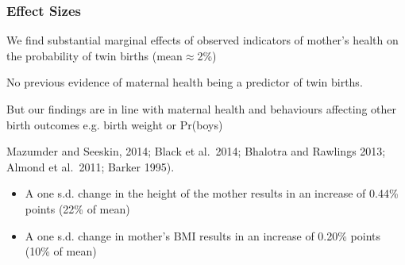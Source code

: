 \documentclass[9pt,letterpaper,subeqn]{beamer}
\begin{document}
\begin{frame}[label=robust]
\frametitle{Effect Sizes}
We find substantial marginal effects of observed indicators of mother’s health on the probability of twin births (mean$\approx$2\%)
\item No previous evidence of maternal health being a predictor of twin births.
\item But our findings are in line with maternal health and behaviours affecting other birth outcomes e.g. birth weight or Pr(boys) 
\item Mazumder and Seeskin, 2014; Black et al.\ 2014;  Bhalotra and Rawlings 2013; Almond et al.\ 2011; Barker 1995).\vspace{6mm}
\begin{itemize}
\item A one s.d. change in the height of the mother results in an increase of 0.44\% points (22\% of mean)
\item A one s.d. change in mother's BMI results in an increase of 0.20\% points (10\% of mean)\\ \vspace{5mm}
\end{itemize}
\end{frame}




\end{document}
